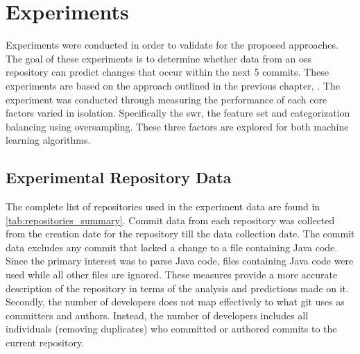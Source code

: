 \chapter{Experiments}
\label{chap:experiments}

Experiments were conducted in order to validate for the proposed approaches. The goal of these experiments is to determine whether data from an \gls{oss} repository can predict changes that occur within the next 5 commits. These experiments are based on the approach outlined in the previous chapter, . The experiment was conducted through measuring the performance of each core factors varied in isolation. Specifically the \gls{swr}, the feature set and categorization balancing using oversampling. These three factors are explored for both machine learning algorithms.

\section{Experimental Repository Data}
\label{sec:experimental_repository_data}



The complete list of repositories used in the experiment data are found in \autoref{tab:repositories_summary}. Commit data from each repository was collected from the creation date for the repository till the data collection date. The commit data excludes any commit that lacked a change to a file containing Java code. Since the primary interest was to parse Java code, files containing Java code were used while all other files are ignored. These measures provide a more accurate description of the repository in terms of the analysis and predictions made on it. Secondly, the number of developers does not map effectively to what git uses as committers and authors. Instead, the number of developers includes all individuals (removing duplicates) who committed or authored commits to the current repository.

